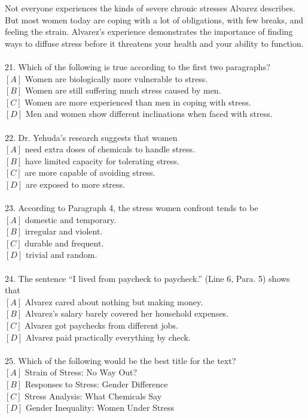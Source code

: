 \documentclass[a4paper]{ctexart}
\begin{document}
\par
Not everyone experiences the kinds of severe chronic stresses Alvarez describes. But most women today are coping with a lot of obligations, with few breaks, and feeling the strain. Alvarez’s experience demonstrates the importance of finding ways to diffuse stress before it threatens your health and your ability to function.
\\
\\
21.	Which of the following is true according to the first two paragraphs?\\
$[A]$ Women are biologically more vulnerable to stress.\\
$[B]$ Women are still suffering much stress caused by men.\\
$[C]$ Women are more experienced than men in coping with stress.\\
$[D]$ Men and women show different inclinations when faced with stress.\\
\\
22.	Dr. Yehuda’s research suggests that women\\
$[A]$ need extra doses of chemicals to handle stress.\\
$[B]$ have limited capacity for tolerating stress.\\
$[C]$ are more capable of avoiding stress.\\
$[D]$ are exposed to more stress.\\
\\
23.	According to Paragraph 4, the stress women confront tends to be\\
$[A]$ domestic and temporary.\\
$[B]$ irregular and violent.\\
$[C]$ durable and frequent.\\
$[D]$ trivial and random.\\
\\
24.	The sentence “I lived from paycheck to paycheck.” (Line 6, Para. 5) shows that\\
$[A]$ Alvarez cared about nothing but making money.\\
$[B]$ Alvarez’s salary barely covered her household expenses.\\
$[C]$ Alvarez got paychecks from different jobs.\\
$[D]$ Alvarez paid practically everything by check.\\
\\
25.	Which of the following would be the best title for the text?\\
$[A]$ Strain of Stress: No Way Out?\\
$[B]$ Responses to Stress: Gender Difference\\
$[C]$ Stress Analysis: What Chemicals Say\\
$[D]$ Gender Inequality: Women Under Stress\\
\end{document}
